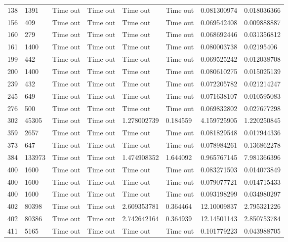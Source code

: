 \begin{landscape}
\begin{longtabu} {|l|l|l|l|l|l|l|l|}
138       & 1391    & Time out & Time out & Time out       & Time out & 0.081300974 & 0.018036366 \\
156       & 409     & Time out & Time out & Time out       & Time out & 0.069542408 & 0.009888887 \\
160       & 279     & Time out & Time out & Time out       & Time out & 0.068692446 & 0.031356812 \\
161       & 1400    & Time out & Time out & Time out       & Time out & 0.080003738 & 0.02195406  \\
199       & 442     & Time out & Time out & Time out       & Time out & 0.069525242 & 0.012038708 \\
200       & 1400    & Time out & Time out & Time out       & Time out & 0.080610275 & 0.015025139 \\
239       & 432     & Time out & Time out & Time out       & Time out & 0.072205782 & 0.021214247 \\
245       & 649     & Time out & Time out & Time out       & Time out & 0.071638107 & 0.010595083 \\
276       & 500     & Time out & Time out & Time out       & Time out & 0.069832802 & 0.027677298 \\
302       & 45305   & Time out & Time out & 1.278002739    & 0.184559 & 4.159725905 & 1.220250845 \\
359       & 2657    & Time out & Time out & Time out       & Time out & 0.081829548 & 0.017944336 \\
373       & 647     & Time out & Time out & Time out       & Time out & 0.078984261 & 0.136862278 \\
384       & 133973  & Time out & Time out & 1.474908352    & 1.644092 & 0.965767145 & 7.981366396 \\
400       & 1600    & Time out & Time out & Time out       & Time out & 0.083271503 & 0.014073849 \\
400       & 1600    & Time out & Time out & Time out       & Time out & 0.079077721 & 0.014715433 \\
400       & 1600    & Time out & Time out & Time out       & Time out & 0.093198299 & 0.034980297 \\
402       & 80398   & Time out & Time out & 2.609353781    & 0.364464 & 12.10009837 & 2.795321226 \\
402       & 80386   & Time out & Time out & 2.742642164    & 0.364939 & 12.14501143 & 2.850753784 \\
411       & 5165    & Time out & Time out & Time out       & Time out & 0.101779223 & 0.043988705 \\

\end{longtabu}
\end{landscape}
